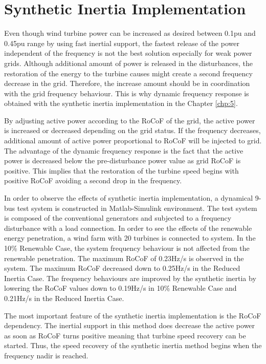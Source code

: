 \section{Synthetic Inertia Implementation}
Even though wind turbine power can be increased as desired between 0.1pu and 0.45pu range by using fast inertial support, the fastest release of the power independent of the frequency is not the best solution especially for weak power grids. Although additional amount of power is released in the disturbances, the restoration of the energy to the turbine causes might create a second frequency decrease in the grid. Therefore, the increase amount should be in coordination with the grid frequency behaviour. This is why dynamic frequency response is obtained with the synthetic inertia implementation in the Chapter \ref{chp:5}. \par
By adjusting active power according to the RoCoF of the grid, the active power is increased or decreased depending on the grid status. If the frequency decreases, additional amount of active power proportional to RoCoF will be injected to grid. The advantage of the dynamic frequency response is the fact that the active power is decreased below the pre-disturbance power value as grid RoCoF is positive. This implies that the restoration of the turbine speed begins with positive RoCoF avoiding a second drop in the frequency.\par
In order to observe the effects of synthetic inertia implementation, a dynamical 9-bus test system is constructed in Matlab-Simulink environment. The test system is composed of the conventional generators and subjected to a frequency disturbance with a load connection. In order to see the effects of the renewable energy penetration, a wind farm with 20 turbines is connected to system. In the 10\% Renewable Case, the system frequency behaviour is not affected from the renewable penetration. The maximum RoCoF of 0.23Hz/s is observed in the system. The maximum RoCoF decreased down to 0.25Hz/s in the Reduced Inertia Case. The frequency behaviours are improved by the synthetic inertia by lowering the RoCoF values down to 0.19Hz/s in 10\% Renewable Case and 0.21Hz/s in the Reduced Inertia Case.
\par
The most important feature of the synthetic inertia implementation is the RoCoF dependency. The inertial support in this method does decrease the active power as soon as RoCoF turns positive meaning that turbine speed recovery can be started. Thus, the speed recovery of the synthetic inertia method begins when the frequency nadir is reached.\par
